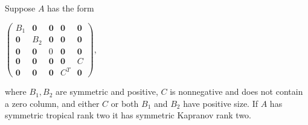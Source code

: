 \documentclass{article}
\begin{document}
\begin{lem}
  Suppose $A$ has the form  
  \begin{center}
    $\left(\begin{array}{ccccc} B_{1} & \textbf{0} & \textbf{0} & \textbf{0} & \textbf{0} \\ \textbf{0} & B_{2} & \textbf{0} & \textbf{0} & \textbf{0} \\ \textbf{0} & \textbf{0} & 0 & \textbf{0} & \textbf{0} \\ \textbf{0} & \textbf{0} & \textbf{0} & \textbf{0} & C \\ \textbf{0} & \textbf{0} & \textbf{0} & C^{T} & \textbf{0} \end{array}\right)$,
  \end{center}
  where $B_{1}, B_{2}$ are symmetric and positive, $C$ is nonnegative and does not contain a zero column, and either $C$ or both $B_{1}$ and $B_{2}$ have positive size. If $A$ has symmetric tropical rank two it has symmetric Kapranov rank two.
\end{lem}
\end{document}
